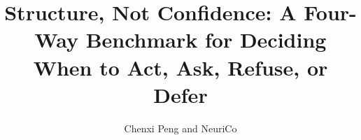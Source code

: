 \documentclass{article}
\title{Structure, Not Confidence: A Four-Way Benchmark for Deciding\\When to Act, Ask, Refuse, or Defer}
\author{Chenxi Peng and NeuriCo}
\begin{document}
\maketitle

\begin{abstract}

\end{abstract}










\appendix

\end{document}

